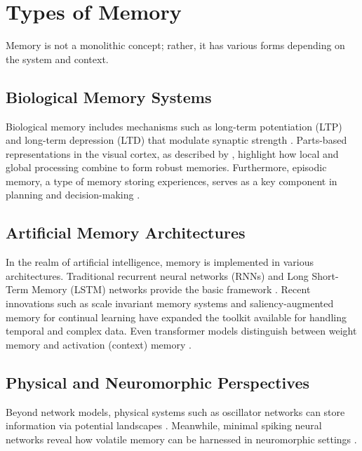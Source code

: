 \documentclass{article}
\begin{document}
\section{Types of Memory}
\label{sec:types}
Memory is not a monolithic concept; rather, it has various forms depending on the system and context.

\subsection{Biological Memory Systems}
Biological memory includes mechanisms such as long-term potentiation (LTP) and long-term depression (LTD) that modulate synaptic strength \parencite{wakeling2004adaptivityperlearning}. Parts-based representations in the visual cortex, as described by \textcite{jitsev2010experiencedrivenformationpartsbasedrepresentations}, highlight how local and global processing combine to form robust memories. Furthermore, episodic memory, a type of memory storing experiences, serves as a key component in planning and decision-making \parencite{schillaci2020predictionerrordrivenmemoryconsolidation}.

\subsection{Artificial Memory Architectures}
In the realm of artificial intelligence, memory is implemented in various architectures. Traditional recurrent neural networks (RNNs) and Long Short-Term Memory (LSTM) networks provide the basic framework \parencite{lakhman2012neuroevolutionresultsemergenceshortterm}. Recent innovations such as scale invariant memory systems \parencite{kabir2024deepreinforcementlearningtimescale} and saliency-augmented memory for continual learning \parencite{bai2022saliencyaugmentedmemorycompletioncontinual} have expanded the toolkit available for handling temporal and complex data. Even transformer models distinguish between weight memory and activation (context) memory \parencite{rannentriki2024revisitingdynamicevaluationonline}.

\subsection{Physical and Neuromorphic Perspectives}
Beyond network models, physical systems such as oscillator networks can store information via potential landscapes \parencite{hoppensteadt2020frequencyphasepotentialforcedstno}. Meanwhile, minimal spiking neural networks reveal how volatile memory can be harnessed in neuromorphic settings \parencite{neves2023volatilememorymotifsminimal}.
\end{document}
